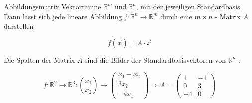 \begin{definition}{Abbildungsmatrix}
    Vektorräume $\mathbb{R}^{m}$ und $\mathbb{R}^{n}$, mit der jeweiligen Standardbasis. Dann lässt sich jede lineare Abbildung $f: \mathbb{R}^{n} \rightarrow \mathbb{R}^{m}$ durch eine $m \times n$ - Matrix $A$ darstellen

    $$
    f(\vec{x})=A \cdot \vec{x}
    $$

    Die Spalten der Matrix $A$ sind die Bilder der Standardbasisvektoren von $\mathbb{R}^{n}$ :

    \begin{center}
    \end{center}
\end{definition}

\begin{example}
    $$
    f: \mathbb{R}^{2} \rightarrow \mathbb{R}^{3}:\binom{x_{1}}{x_{2}} \rightarrow \begin{pmatrix} x_{1}-x_{2} \\ 3 x_{2} \\ -4 x_{1} \end{pmatrix}
    \Rightarrow A = \begin{pmatrix} 1 & -1 \\ 0 & 3 \\ -4 & 0 \end{pmatrix}
    $$
\end{example}

